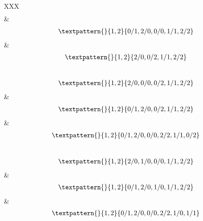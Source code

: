 \begin{center}
\begin{longtabu}[l]{XXX}
\begin{equation}
\begin{gathered}
	\end{gathered}
	\label{cls:116}
\end{equation}
    &
\begin{equation}
	\begin{gathered}
		\textpattern{}{1,2}{0/1,2/0,0/0,1/1,2/2}
	\end{gathered}
	\label{cls:117}
\end{equation}
    &
\begin{equation}
	\begin{gathered}
		\textpattern{}{1,2}{2/0,0/2,1/1,2/2}
	\end{gathered}
	\label{cls:118}
\end{equation}
\\
\begin{equation}
	\begin{gathered}
		\textpattern{}{1,2}{2/0,0/0,0/2,1/1,2/2}
	\end{gathered}
	\label{cls:119}
\end{equation}
    &
\begin{equation}
	\begin{gathered}
		\textpattern{}{1,2}{0/1,2/0,0/2,1/1,2/2}
	\end{gathered}
	\label{cls:120}
\end{equation}
    &
\begin{equation}
	\begin{gathered}
		\textpattern{}{1,2}{0/1,2/0,0/0,2/2,1/1,0/2}
	\end{gathered}
	\label{cls:121}
\end{equation}
\\
\begin{equation}
	\begin{gathered}
		\textpattern{}{1,2}{2/0,1/0,0/0,1/1,2/2}
	\end{gathered}
	\label{cls:122}
\end{equation}
&
\begin{equation}
	\begin{gathered}
		\textpattern{}{1,2}{0/1,2/0,1/0,1/1,2/2}
	\end{gathered}
	\label{cls:123}
\end{equation}
&
\begin{equation}
	\begin{gathered}
		\textpattern{}{1,2}{0/1,2/0,0/0,2/2,1/0,1/1}
	\end{gathered}
	\label{cls:124}
\end{equation}
\\
\begin{equation}

\end{equation}
\end{longtabu}
\end{center}
